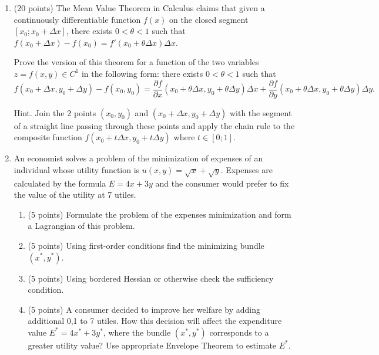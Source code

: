 \documentclass[12pt]{article} %
\theoremstyle{definition} %
\def \putyourname{\fbox{
    \begin{minipage}{42em}
      Name, group no:\vspace*{3ex}\par
      \noindent\dotfill\vspace{2mm}
    \end{minipage}
  }
}
\begin{document}
  \newpage
  \putyourname
  \begin{enumerate}[resume]
  
    \item (20 points) The Mean Value Theorem in Calculus claims that given a continuously differentiable function $f(x)$  
    on the closed segment $[x_0; x_0 + \Delta x]$, there exists $0 < \theta < 1$ such that $f(x_0 + \Delta x) - f(x_0) = 
    f'(x_0 + \theta \Delta x) \Delta x$. 
  
    Prove the version of this theorem for a function of the two variables $z = f(x,y) \in C^1$ in the following form: 
    there exists $0 < \theta < 1$ such that 
    \[
      f(x_0 + \Delta x, y_0 + \Delta y) - f(x_0, y_0) = \frac{\partial f}{\partial x}(x_0 + \theta \Delta x, y_0 + \theta \Delta y)\Delta x + \frac{\partial f}{\partial y}(x_0 + \theta \Delta x, y_0 + \theta \Delta y)\Delta y.  
    \]
    
    
    Hint. Join the 2 points $(x_0, y_0)$ and $(x_0 + \Delta x, y_0 + \Delta y)$ with the segment of a straight line passing through these points 
    and apply the chain rule to the composite function $f(x_0 + t \Delta x, y_0 + t \Delta y)$ where $t\in [0;1]$.
    
    
    \newpage
    \putyourname
      \item An economist solves a problem of the minimization of expenses of an individual whose utility function is $u(x, y) = \sqrt{x} + \sqrt{y}$. 
    Expenses are calculated by the formula $E=4x + 3y$ and the consumer would prefer to fix the value of the utility at 7 utiles.
    \begin{enumerate}
    \item (5 points) Formulate the problem of the expenses minimization and form a Lagrangian of this problem.
    \item (5 points) Using first-order conditions find the minimizing bundle $(x^*, y^*)$.
    \item (5 points) Using bordered Hessian or otherwise check the sufficiency condition.
    \item (5 points) A consumer decided to improve her welfare by adding additional 0,1 to 7 utiles. 
    How this decision will affect the expenditure value $E^* = 4x^* + 3y^*$, 
    where the bundle $(x^*, y^*)$ corresponds to a greater utility value? 
    Use appropriate Envelope Theorem to estimate $E^*$.
  \end{enumerate}
  
  \end{enumerate}
  
\end{document}
